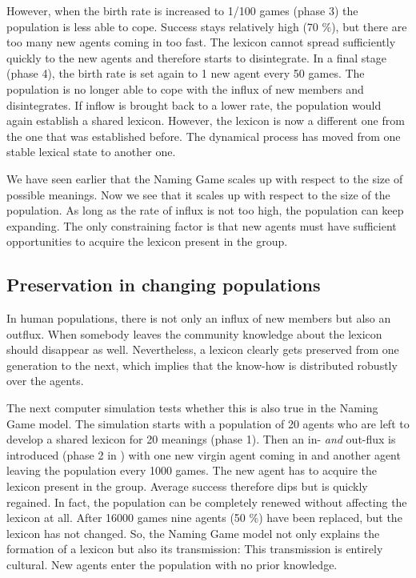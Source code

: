 However, when the birth rate is increased
to 1/100 games (phase 3) the population is less able to cope. 
Success stays relatively high (70 \%), but there are too many 
new agents coming in too fast. The lexicon cannot spread 
sufficiently quickly to the new agents and therefore starts 
to disintegrate. In a final stage (phase 4), the birth rate 
is set again to 1 new agent every 50 games. The population is no longer  
able to cope with the influx of new members and disintegrates. 
If inflow is brought back to a lower rate, the population would 
again establish a shared lexicon. However, 
the lexicon is now a different one
from the one that was established before. 
The dynamical process
has moved from one stable lexical state to another one.  

We have seen earlier that the Naming Game scales
up with respect to the size of possible meanings. Now 
we see that it scales up with respect to the size of 
the population. As long as the rate of influx is not too
high, the population can keep expanding. 
The only constraining factor is that new agents
must have sufficient opportunities to acquire the lexicon
present in the group. 

\subsection{Preservation in changing populations}

In human populations, there is not only an influx of 
new members but also an outflux. When somebody leaves
the community knowledge about the lexicon should
disappear as well. Nevertheless, a lexicon clearly 
gets preserved from one generation to the next, which 
implies that the know-how is distributed robustly over
the agents.

The next computer simulation tests whether this is also true
in the Naming Game model. 
The simulation starts with a population of 20 agents who 
are left to develop a shared lexicon for 
20 meanings (phase 1). 
Then an in- {\it and} out-flux is introduced (phase 2 in 
) with one
new virgin agent coming in 
and another agent leaving the population every 1000 games. 
The new agent has to acquire the lexicon present in the group. 
Average success therefore dips but is quickly regained.
In fact, the population can be completely renewed without affecting the
lexicon at all. 
After 16000 games nine agents (50 \%) have been
replaced, but the lexicon has not changed. So, the Naming Game model
not only explains the formation of 
a lexicon but also its transmission: This transmission is 
entirely cultural. New agents enter the population with no 
prior knowledge. 

